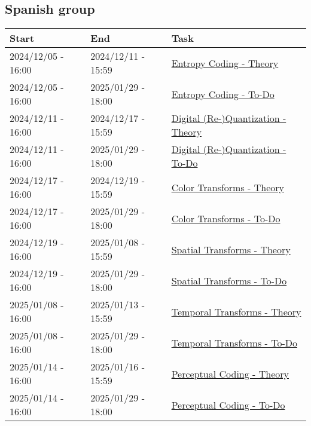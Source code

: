 \subsection{Spanish group}
\begin{tabular}{|l|l|l|}
  \hline
  Start & End & Task \\
  \hline
  2024/12/05 - 16:00 & 2024/12/11 - 15:59 & \href{https://sistemas-multimedia.github.io/contents/entropy_coding/}{Entropy Coding - Theory} \\ %
  2024/12/05 - 16:00 & 2025/01/29 - 18:00 & \href{https://sistemas-multimedia.github.io/contents/entropy_coding/#x1-110007}{Entropy Coding - To-Do} \\
  2024/12/11 - 16:00 & 2024/12/17 - 15:59 & \href{https://sistemas-multimedia.github.io/contents/quantization/}{Digital (Re-)Quantization - Theory} \\ %
  2024/12/11 - 16:00 & 2025/01/29 - 18:00 & \href{https://sistemas-multimedia.github.io/contents/quantization/#x1-150008}{Digital (Re-)Quantization - To-Do} \\
  2024/12/17 - 16:00 & 2024/12/19 - 15:59 & \href{https://sistemas-multimedia.github.io/contents/color_transforms/}{Color Transforms - Theory} \\ %
  2024/12/17 - 16:00 & 2025/01/29 - 18:00 & \href{https://sistemas-multimedia.github.io/contents/color_transforms/#x1-100006}{Color Transforms - To-Do} \\
  2024/12/19 - 16:00 & 2025/01/08 - 15:59 & \href{https://sistemas-multimedia.github.io/contents/spatial_transforms/}{Spatial Transforms - Theory} \\ %
  2024/12/19 - 16:00 & 2025/01/29 - 18:00 & \href{https://sistemas-multimedia.github.io/contents/spatial_transforms/#x1-80006}{Spatial Transforms - To-Do} \\
  2025/01/08 - 16:00 & 2025/01/13 - 15:59 & \href{https://sistemas-multimedia.github.io/contents/temporal_transforms/}{Temporal Transforms - Theory} \\ %
  2025/01/08 - 16:00 & 2025/01/29 - 18:00 & \href{https://sistemas-multimedia.github.io/contents/temporal_transforms/#x1-90008}{Temporal Transforms - To-Do} \\
  2025/01/14 - 16:00 & 2025/01/16 - 15:59 & \href{https://sistemas-multimedia.github.io/contents/perceptual_coding/}{Perceptual Coding - Theory} \\ %
  2025/01/14 - 16:00 & 2025/01/29 - 18:00 & \href{https://sistemas-multimedia.github.io/contents/perceptual_coding/#x1-100009}{Perceptual Coding - To-Do} \\

\end{tabular}
